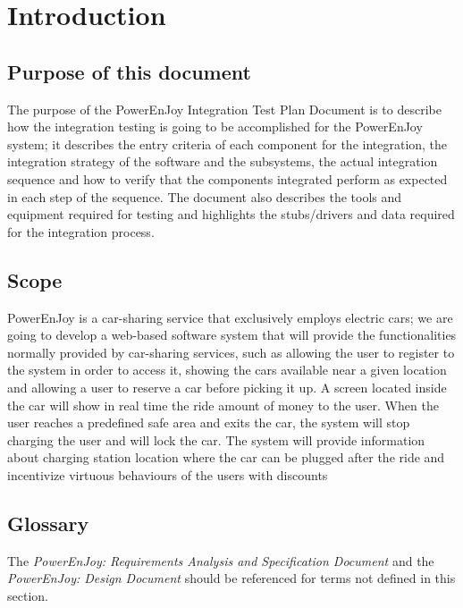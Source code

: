 \section{Introduction}

\subsection{Purpose of this document}
The purpose of the PowerEnJoy Integration Test Plan Document is to describe how the integration testing is going to be accomplished for the PowerEnJoy system; it describes the entry criteria of each component for the integration, the integration strategy of the software and the subsystems, the actual integration sequence and how to verify that the components integrated perform as expected in each step of the sequence. The document also describes the tools and equipment required for testing and highlights the stubs/drivers and data required for the integration process.

\subsection{Scope}
PowerEnJoy is a car-sharing service that exclusively employs electric cars; we are going to develop a web-based software system that will provide the functionalities normally provided by car-sharing services, such as allowing the user to register to the system in order to access it, showing the cars available near a given location and allowing a user to reserve a car before picking it up.
A screen located inside the car will show in real time the ride amount of money to the user. When the user reaches a predefined safe area and exits the car, the system will stop charging the user and will lock the car. The system will provide information about charging station location where the car can be plugged after the ride and incentivize virtuous behaviours of the users with discounts\cite{RASD}

\subsection{Glossary}
The \emph{PowerEnJoy: Requirements Analysis and Specification Document}\cite{RASD} and the \emph{PowerEnJoy: Design Document}\cite{DD} should be referenced for terms not defined in this section.

